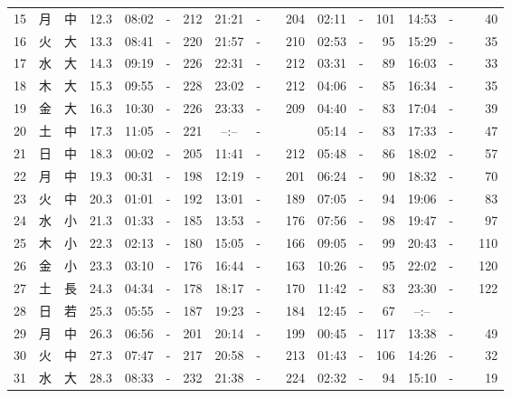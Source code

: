 \documentclass[12pt. a4j]{jsarticle}
\begin{document}
\begin{table}[htbp]
\begin{center}
\begin{tabular}{|rc|cr|ccrccr|ccrccr|}
15 & 月 & 中 & 12.3 &  08:02 &-& 212  &  21:21 &-& 204  &  02:11 &-& 101  &  14:53 &-&  40  \\
16 & 火 & 大 & 13.3 &  08:41 &-& 220  &  21:57 &-& 210  &  02:53 &-&  95  &  15:29 &-&  35  \\
17 & 水 & 大 & 14.3 &  09:19 &-& 226  &  22:31 &-& 212  &  03:31 &-&  89  &  16:03 &-&  33  \\
18 & 木 & 大 & 15.3 &  09:55 &-& 228  &  23:02 &-& 212  &  04:06 &-&  85  &  16:34 &-&  35  \\
19 & 金 & 大 & 16.3 &  10:30 &-& 226  &  23:33 &-& 209  &  04:40 &-&  83  &  17:04 &-&  39  \\
20 & 土 & 中 & 17.3 &  11:05 &-& 221  &  --:-- &-&~~~~~ &  05:14 &-&  83  &  17:33 &-&  47  \\
21 & 日 & 中 & 18.3 &  00:02 &-& 205  &  11:41 &-& 212  &  05:48 &-&  86  &  18:02 &-&  57  \\
22 & 月 & 中 & 19.3 &  00:31 &-& 198  &  12:19 &-& 201  &  06:24 &-&  90  &  18:32 &-&  70  \\
23 & 火 & 中 & 20.3 &  01:01 &-& 192  &  13:01 &-& 189  &  07:05 &-&  94  &  19:06 &-&  83  \\
24 & 水 & 小 & 21.3 &  01:33 &-& 185  &  13:53 &-& 176  &  07:56 &-&  98  &  19:47 &-&  97  \\
25 & 木 & 小 & 22.3 &  02:13 &-& 180  &  15:05 &-& 166  &  09:05 &-&  99  &  20:43 &-& 110  \\
26 & 金 & 小 & 23.3 &  03:10 &-& 176  &  16:44 &-& 163  &  10:26 &-&  95  &  22:02 &-& 120  \\
27 & 土 & 長 & 24.3 &  04:34 &-& 178  &  18:17 &-& 170  &  11:42 &-&  83  &  23:30 &-& 122  \\
28 & 日 & 若 & 25.3 &  05:55 &-& 187  &  19:23 &-& 184  &  12:45 &-&  67  &  --:-- &-&~~~~~ \\
29 & 月 & 中 & 26.3 &  06:56 &-& 201  &  20:14 &-& 199  &  00:45 &-& 117  &  13:38 &-&  49  \\
30 & 火 & 中 & 27.3 &  07:47 &-& 217  &  20:58 &-& 213  &  01:43 &-& 106  &  14:26 &-&  32  \\
31 & 水 & 大 & 28.3 &  08:33 &-& 232  &  21:38 &-& 224  &  02:32 &-&  94  &  15:10 &-&  19  \\
   \hline
   \end{tabular}
   \end{center}
\end{table}
\newpage
\end{document}
